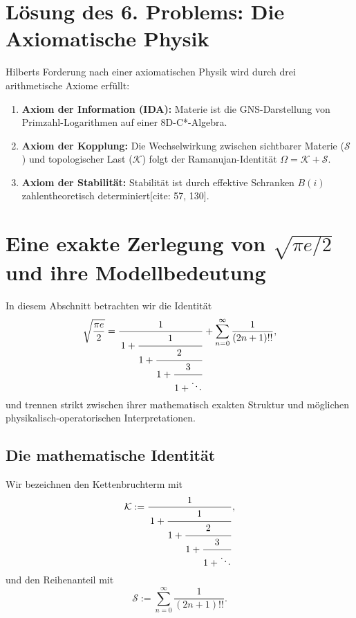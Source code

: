 \documentclass[12pt,a4paper]{article}
\begin{document}
	
	
	\section{Lösung des 6. Problems: Die Axiomatische Physik}
	Hilberts Forderung nach einer axiomatischen Physik wird durch drei arithmetische Axiome erfüllt:
	\begin{enumerate}
		\item \textbf{Axiom der Information (IDA):} Materie ist die GNS-Darstellung von Primzahl-Logarithmen auf einer 8D-C*-Algebra.
		\item \textbf{Axiom der Kopplung:} Die Wechselwirkung zwischen sichtbarer Materie ($\mathcal{S}$) und topologischer Last ($\mathcal{K}$) folgt der Ramanujan-Identität $\Omega = \mathcal{K} + \mathcal{S}$.
		\item \textbf{Axiom der Stabilität:} Stabilität ist durch effektive Schranken $B(i)$ zahlentheoretisch determiniert[cite: 57, 130].
	\end{enumerate}
	
	\section{Eine exakte Zerlegung von \texorpdfstring{$\sqrt{\pi e/2}$}{sqrt(pi e / 2)} und ihre Modellbedeutung}
	
	In diesem Abschnitt betrachten wir die Identität
	\begin{equation}
		\sqrt{\frac{\pi e}{2}}
		=
		\frac{1}{\,1+\cfrac{1}{1+\cfrac{2}{1+\cfrac{3}{1+\ddots}}}}
		+
		\sum_{n=0}^{\infty}\frac{1}{(2n+1)!!},
		\label{eq:master-splitting}
	\end{equation}
	und trennen strikt zwischen ihrer mathematisch exakten Struktur und möglichen physikalisch-operatorischen Interpretationen.
	
	\subsection{Die mathematische Identität}
	
	Wir bezeichnen den Kettenbruchterm mit
	\begin{equation}
		\mathcal K
		:=
		\frac{1}{\,1+\cfrac{1}{1+\cfrac{2}{1+\cfrac{3}{1+\ddots}}}},
		\label{eq:def-K}
	\end{equation}
	und den Reihenanteil mit
	\begin{equation}
		\mathcal S
		:=
		\sum_{n=0}^{\infty}\frac{1}{(2n+1)!!}.
		\label{eq:def-S}
	\end{equation}
	
\end{document}
